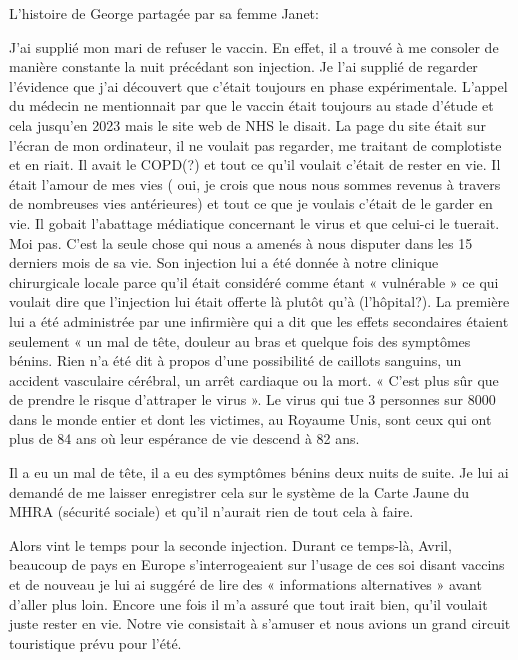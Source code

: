 
L’histoire de George partagée par sa femme Janet:

J’ai supplié mon mari de refuser le vaccin. En effet, il a trouvé à me consoler
de manière constante la nuit précédant son injection. Je l’ai supplié de
regarder l’évidence que j’ai découvert que c’était toujours en phase
expérimentale. L’appel du médecin ne mentionnait par que le vaccin était
toujours au stade d’étude et cela jusqu’en 2023 mais le site web de NHS le
disait. La page du site était sur l’écran de mon ordinateur, il ne voulait pas
regarder, me traitant de complotiste et en riait. Il avait le COPD(?) et tout ce
qu’il voulait c’était de rester en vie. Il était l’amour de mes vies ( oui, je
crois que nous nous sommes revenus à travers de nombreuses vies antérieures) et
tout ce que je voulais c’était de le garder en vie. Il gobait l’abattage
médiatique concernant le virus et que celui-ci le tuerait. Moi pas. C’est la
seule chose qui nous a amenés à nous disputer dans les 15 derniers mois de sa
vie. Son injection lui a été donnée à notre clinique chirurgicale locale parce
qu’il était considéré comme étant « vulnérable » ce qui voulait dire que
l’injection lui était offerte là plutôt qu’à (l’hôpital?). La première lui a été
administrée par une infirmière qui a dit que les effets secondaires étaient
seulement « un mal de tête, douleur au bras et quelque fois des symptômes
bénins. Rien n’a été dit à propos d’une possibilité de caillots sanguins, un
accident vasculaire cérébral, un arrêt cardiaque ou la mort. « C’est plus sûr
que de prendre le risque d’attraper le virus ». Le virus qui tue 3 personnes sur
8000 dans le monde entier et dont les victimes, au Royaume Unis, sont ceux qui
ont plus de 84 ans où leur espérance de vie descend à 82 ans.

Il a eu un mal de tête, il a eu des symptômes bénins deux nuits de suite. Je lui
ai demandé de me laisser enregistrer cela sur le système de la Carte Jaune du
MHRA (sécurité sociale) et qu’il n’aurait rien de tout cela à faire.

Alors vint le temps pour la seconde injection. Durant ce temps-là, Avril,
beaucoup de pays en Europe s’interrogeaient sur l’usage de ces soi disant
vaccins et de nouveau je lui ai suggéré de lire des « informations alternatives
» avant d’aller plus loin. Encore une fois il m’a assuré que tout irait bien,
qu’il voulait juste rester en vie. Notre vie consistait à s’amuser et nous
avions un grand circuit touristique prévu pour l’été.

